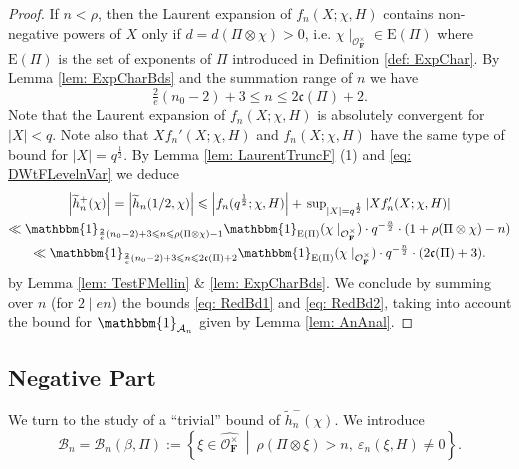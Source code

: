 \documentclass[A4]{amsart}
\def\leq{\leqslant}
\numberwithin{equation}{section} \everymath{\displaystyle}
\newcommand{\id}{\mathbbm{1}}
\newcommand{\F}{\mathbf{F}}
\newcommand{\vO}{\mathcal{O}}
\newcommand{\norm}[1][\cdot]{\lvert #1 \rvert}
\newcommand{\extnorm}[1]{\left\lvert #1 \right\rvert}
\newcommand{\cond}{\mathfrak{c}}
\newcommand{\condL}{\mathfrak{\rho}}
\begin{document}
\begin{proof}
\noindent If $n < \condL$, then the Laurent expansion of $f_n(X; \chi,H)$ contains non-negative powers of $X$ only if $d=d(\Pi \otimes \chi) > 0$, i.e. $\chi \mid_{\vO_{\F}^{\times}} \in \mathrm{E}(\Pi)$ where $\mathrm{E}(\Pi)$ is the set of exponents of $\Pi$ introduced in Definition \ref{def: ExpChar}. By Lemma \ref{lem: ExpCharBds} and the summation range of $n$ we have
\begin{equation} \label{eq: ExpNumBds} 
	\tfrac{2}{e}(n_0-2)+3 \leq n \leq 2 \cond(\Pi)+2. 
\end{equation}
	 Note that the Laurent expansion of $f_n(X; \chi,H)$ is absolutely convergent for $\norm[X] < q$. Note also that $Xf_n'(X; \chi, H)$ and $f_n(X; \chi,H)$ have the same type of bound for $\norm[X] = q^{\frac{1}{2}}$. By Lemma \ref{lem: LaurentTruncF} (1) and \eqref{eq: DWtFLevelnVar} we deduce
\begin{multline} \label{eq: RedBd2}
	\extnorm{\widetilde{h}_n^+(\chi)} = \extnorm{\widetilde{h}_n(1/2, \chi)} \leq \extnorm{f_n(q^{\frac{1}{2}}; \chi, H)} + \sideset{}{_{\norm[X] = q^{\frac{1}{2}}}} \sup \extnorm{Xf_n'(X; \chi,H)} \\
	\ll \id_{\frac{2}{e}(n_0-2)+3 \leq n \leq \condL(\Pi \otimes \chi)-1} \id_{\mathrm{E}(\Pi)}(\chi \mid_{\vO_{\F}^{\times}}) \cdot q^{-\frac{n}{2}} \cdot \left( 1 + \condL(\Pi \otimes \chi) - n \right) \\
	\ll \id_{\frac{2}{e}(n_0-2)+3 \leq n \leq 2 \cond(\Pi)+2} \id_{\mathrm{E}(\Pi)}(\chi \mid_{\vO_{\F}^{\times}}) \cdot q^{-\frac{n}{2}} \cdot (2\cond(\Pi)+3).
\end{multline}
	by Lemma \ref{lem: TestFMellin} \& \ref{lem: ExpCharBds}. We conclude by summing over $n$ (for $2 \mid en$) the bounds \eqref{eq: RedBd1} and \eqref{eq: RedBd2}, taking into account the bound for $\id_{\mathcal{A}_n}$ given by Lemma \ref{lem: AnAnal}.
\end{proof}


	\subsection{Negative Part}

	We turn to the study of a ``trivial'' bound of $\widetilde{h}_n^-(\chi)$. We introduce
\begin{equation}
	\mathcal{B}_n = \mathcal{B}_n(\beta, \Pi) := \left\{ \xi \in \widehat{\vO_{\F}^{\times}} \ \middle| \ \condL(\Pi \otimes \xi) > n, \ \varepsilon_n(\xi,H) \neq 0 \right\}.
\end{equation}
\end{document}

